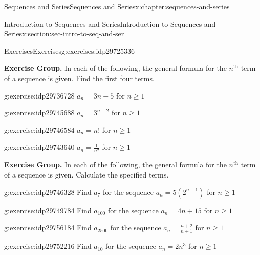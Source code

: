 \documentclass[twoside,10pt,]{book}
\numberwithin{equation}{section}
\newcommand{\nth}{{n^{\text{th}}}}
\begin{document}
\begin{chapterptx}{Sequences and Series}{}{Sequences and Series}{}{}{x:chapter:sequences-and-series}
\begin{sectionptx}{Introduction to Sequences and Series}{}{Introduction to Sequences and Series}{}{}{x:section:sec-intro-to-seq-and-ser}
\begin{exercises-subsection}{Exercises}{}{Exercises}{}{}{g:exercises:idp29725336}
\begin{exercisegroup}
\end{exercisegroup}
\par\medskip\noindent
\par\medskip\noindent%
\textbf{Exercise Group.}\space\space%
In each of the following, the general formula for the \(\nth{}\) term of a sequence is given.  Find the first four terms.\begin{exercisegroup}
\begin{divisionexerciseeg}{17}{}{}{g:exercise:idp29736728}%
\(a_n = 3n - 5\) for \(n \ge 1\)\end{divisionexerciseeg}%
\begin{divisionexerciseeg}{18}{}{}{g:exercise:idp29745688}%
\(a_n = 3^{n - 2}\) for \(n \ge 1\)\end{divisionexerciseeg}%
\begin{divisionexerciseeg}{19}{}{}{g:exercise:idp29746584}%
\(a_n = n!\) for \(n \ge 1\)\end{divisionexerciseeg}%
\begin{divisionexerciseeg}{20}{}{}{g:exercise:idp29743640}%
\(a_n = \frac{1}{n^2}\) for \(n \ge 1\)\end{divisionexerciseeg}%
\end{exercisegroup}
\par\medskip\noindent
\par\medskip\noindent%
\textbf{Exercise Group.}\space\space%
In each of the following, the general formula for the \(\nth{}\) term of a sequence is given.  Calculate the specified terms.\begin{exercisegroup}
\begin{divisionexerciseeg}{21}{}{}{g:exercise:idp29746328}%
Find \(a_7\) for the sequence \(a_n = 5\left( 2^{n + 1} \right)\) for \(n \ge 1\)\end{divisionexerciseeg}%
\begin{divisionexerciseeg}{22}{}{}{g:exercise:idp29749784}%
Find \(a_{100}\) for the sequence \(a_n = 4n + 15\) for \(n \ge 1\)\end{divisionexerciseeg}%
\begin{divisionexerciseeg}{23}{}{}{g:exercise:idp29756184}%
Find \(a_{2500}\) for the sequence \(a_n = \frac{n + 2}{n + 1}\) for \(n \ge 1\)\end{divisionexerciseeg}%
\begin{divisionexerciseeg}{24}{}{}{g:exercise:idp29752216}%
Find \(a_{10}\) for the sequence \(a_n = 2n^3\) for \(n \ge 1\)\end{divisionexerciseeg}%
\end{exercisegroup}

\end{exercises-subsection}
\end{sectionptx}
\end{chapterptx}
\end{document}
